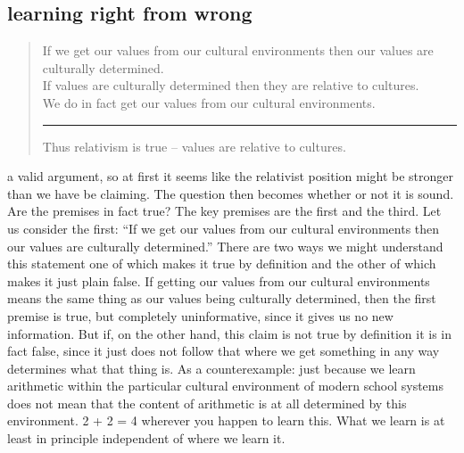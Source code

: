 \documentclass[justified]{tufte-book}
\newenvironment{argument}{\begin{quote}\normalsize}{\end{quote}}
\begin{document}
\hypertarget{learning-right-from-wrong}{%
\subsection*{learning right from wrong}\label{learning-right-from-wrong}}

\begin{argument}
If we get our values from our cultural environments then our values are
culturally determined.\\
If values are culturally determined then they are relative to
cultures.\\
We do in fact get our values from our cultural environments.\\

\begin{center}\rule{0.5\linewidth}{\linethickness}\end{center}

Thus relativism is true -- values are relative to cultures.
\end{argument}

 a valid argument, so at first it seems like the relativist position might be stronger than we have be claiming. The question then becomes whether or not it is sound. Are the premises in fact true? The key premises are the first and the third. Let us consider the first: ``If we get our values from our cultural environments then our values are culturally determined.'' There are two ways we might understand this statement one of which makes it true by definition and the other of which makes it just plain false. If getting our values from our cultural environments means the same thing as our values being culturally determined, then the first premise is true, but completely uninformative, since it gives us no new information. But if, on the other hand, this claim is not true by definition it is in fact false, since it just does not follow that where we get something in any way determines what that thing is. As a counterexample: just because we learn arithmetic within the particular cultural environment of modern school systems does not mean that the content of arithmetic is at all determined by this environment. 2 + 2 = 4 wherever you happen to learn this. What we learn is at least in principle independent of where we learn it.
\end{document}
